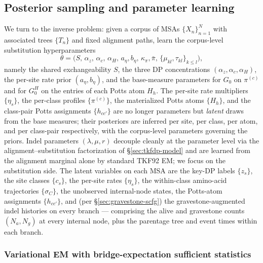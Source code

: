 \subsection{Posterior sampling and parameter learning}
\label{sec:tkfdp-svi}

We turn to the inverse problem: given a corpus of MSAs
$\{X_n\}_{n=1}^N$ with associated trees $\{T_n\}$ and fixed
alignment paths, learn the corpus-level substitution hyperparameters
\[
\theta = \bigl(S,\, \alpha_z,\, \alpha_c,\, \alpha_H,\, a_\eta, b_\eta,\,
\kappa_\pi, \bar\pi,\, \{\mu_{kl}, \tau_{kl}\}_{k \leq l}\bigr),
\]
namely the shared exchangeability $S$, the three DP concentrations
$(\alpha_z, \alpha_c, \alpha_H)$, the per-site rate prior
$(a_\eta, b_\eta)$, and the base-measure parameters for $G_0$ on
$\pi^{(c)}$ and for $G_0^H$ on the entries of each Potts atom
$H_h$. The per-site rate multipliers $\{\eta_s\}$, the per-class
profiles $\{\pi^{(c)}\}$, the materialized Potts atoms $\{H_h\}$,
and the class-pair Potts assignments $\{h_{cc'}\}$ are no longer
parameters but \emph{latent} draws from the base measures; their
posteriors are inferred per site, per class, per atom, and per
class-pair respectively, with the corpus-level parameters governing
the priors. Indel parameters $(\lambda, \mu, r)$ decouple cleanly at
the parameter level via the alignment--substitution factorization
of \S\ref{sec:tkfdp-model} and are learned from the alignment
marginal alone by standard TKF92 EM; we focus on the substitution
side. The latent variables on each MSA are the key-DP labels
$\{z_s\}$, the site classes $\{c_s\}$, the per-site rates
$\{\eta_s\}$, the within-class amino-acid trajectories
$\{\sigma_C\}$, the unobserved internal-node states, the Potts-atom
assignments $\{h_{cc'}\}$, and (per \S\ref{sec:gravestone-scfg}) the
gravestone-augmented indel histories on every branch --- comprising
the alive and gravestone counts $(N_a, N_g)$ at every internal
node, plus the parentage tree and event times within each branch.

\subsubsection*{Variational EM with bridge-expectation sufficient
statistics}

